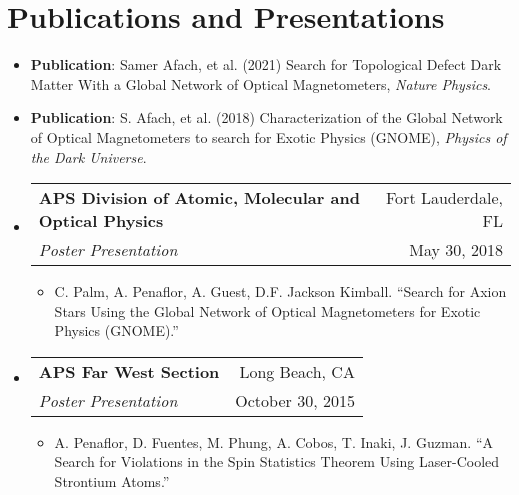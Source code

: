 \documentclass[letterpaper,11pt]{article}
\makeatletter
\newcommand{\resumeItem}[2]{
  \item\small{
    \textbf{#1}{: #2 \vspace{-4pt}}
  }
}
\newcommand{\resumeSubheading}[4]{
  \vspace{0pt}\item
    \begin{tabular*}{0.97\textwidth}{l@{\extracolsep{\fill}}r}
      \textbf{#1} & #2 \\
      \textit{\small#3} & \small #4 \\
    \end{tabular*}\vspace{-5pt}
}
\newcommand{\resumeSubItem}[2]{\resumeItem{#1}{#2}\vspace{-4pt}}
\newcommand{\resumeSubHeadingListStart}{\begin{itemize}[leftmargin=*]}
\newcommand{\resumeSubHeadingListEnd}{\end{itemize}}
\newcommand{\resumeItemListStart}{\begin{itemize}}
\newcommand{\resumeItemListEnd}{\end{itemize}\vspace{-5pt}}
\makeatother
\begin{document}
\section{Publications and Presentations}
  \resumeSubHeadingListStart
    \resumeSubItem{Publication}
      {Samer Afach, et al. (2021) Search for Topological Defect Dark Matter With a Global Network of Optical Magnetometers, \textit{Nature Physics}.}
    \resumeSubItem{Publication}
      {S. Afach, et al. (2018) Characterization of the Global Network of Optical Magnetometers to
search for Exotic Physics (GNOME), \textit{Physics of the Dark Universe}.}
    \resumeSubHeadingListEnd
    \resumeSubHeadingListStart
        \resumeSubheading{APS Division of Atomic, Molecular and Optical Physics}{Fort Lauderdale, FL}{Poster Presentation}{May 30, 2018}
        \resumeItemListStart
            \item{
            C. Palm, A. Penaflor, A. Guest, D.F. Jackson Kimball. ``Search for Axion Stars Using the Global Network of Optical Magnetometers for Exotic Physics (GNOME).''}
        \resumeItemListEnd
        \resumeSubheading{APS Far West Section}{Long Beach, CA}{Poster Presentation}{October 30, 2015}
        \resumeItemListStart
            \item{A. Penaflor, D. Fuentes, M. Phung, A. Cobos, T. Inaki, J. Guzman. ``A Search for Violations in the Spin Statistics Theorem Using Laser-Cooled Strontium Atoms.''}
        \resumeItemListEnd
    
    \resumeSubHeadingListEnd
\end{document}
